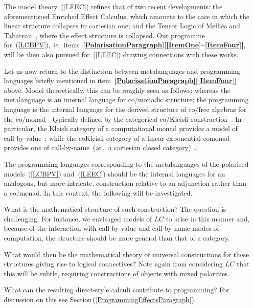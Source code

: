 \documentclass[11pt,twocolumn]{article}
\newcounter{CC}
\newenvironment{resenumerate}
  {\begin{list}{[\textbf{\arabic{CC}]}}
  {\usecounter{CC}
   \setlength{\topsep}{2pt}
   \setlength{\partopsep}{2pt}
   \setlength{\itemsep}{2.5pt}
   \setlength{\parsep}{2.5pt}
   \setlength{\leftmargin}{1.65em}
   \setlength{\labelwidth}{1.15em}
 }}
  {\end{list}}
\newcommand{\pref}[1]{\,(\ref{#1})}
\newcommand{\itemref}[1]{\textbf{[\ref{#1}]}}
\newcommand{\ie}{\emph{ie.}}
\newcommand{\LC}{\mbox{$LC$}}
\begin{document}
The model theory~(\ref{LEEC}) refines that of two recent developments: the
aforementioned Enriched Effect Calculus, which amounts to the case in
which the linear structure collapses to cartesian one; and the Tensor
Logic of Melli\`es and Tabareau~\cite{TensorLogic}, where the effect
structure is collapsed.  Our programme for~(\ref{LCBPV}),
\ie~items~\mbox{\textbf{\ref{PolarisationParagraph}}\thinspace\textbf{[\ref{ItemOne}--\ref{ItemFour}]}},
will be then also pursued for~(\ref{LEEC}) drawing connections with these
works.

Let us now return to the distinction between metalanguages and programming
languages briefly mentioned in
item~\textbf{\ref{PolarisationParagraph}}\thinspace\itemref{ItemFour} above.
Model theoretically, this can be roughly seen as follows: whereas the
metalanguage is an internal language for co/monadic structure; the programming
language is the internal language for the derived structure of co/free
algebras for the co/monad---typically defined by the categorical co/Kleisli
construction~\cite{MacLane}.  In particular, the Kleisli category of a
computational monad provides a model of call-by-value~\cite{MoggiLambdaC};
while the coKleisli category of a linear exponential comonad provides one
of call-by-name~(\ie,~a cartesian closed category)~\cite{Seely}.

The programming languages corresponding to the metalanguages of the
polarised models~(\ref{LCBPV}) and~(\ref{LEEC}) should be the internal
languages for an analogous, but more intricate, construction relative to
an adjunction rather than a co/monad.  In this context, the following will
be investigated.
\begin{resenumerate}\setcounter{CC}{4}
\item
  What is the mathematical structure of such construction?  
  The question is challenging.  For instance, we envisaged models of {\LC} to
  arise in this manner and, because of the interaction with call-by-value and
  call-by-name modes of computation, the structure should be more general than
  that of a category.

\item
  What would then be the mathematical theory of universal constructions for
  these structures giving rise to logical connectives?  
  Note again from considering {\LC} that this will be subtle, requiring
  constructions of objects with mixed polarities.

\item
  What can the resulting direct-style calculi contribute to programming?
  For discussion on this see Section\pref{ProgrammingEffectsParagraph}.
\end{resenumerate}
\end{document}
